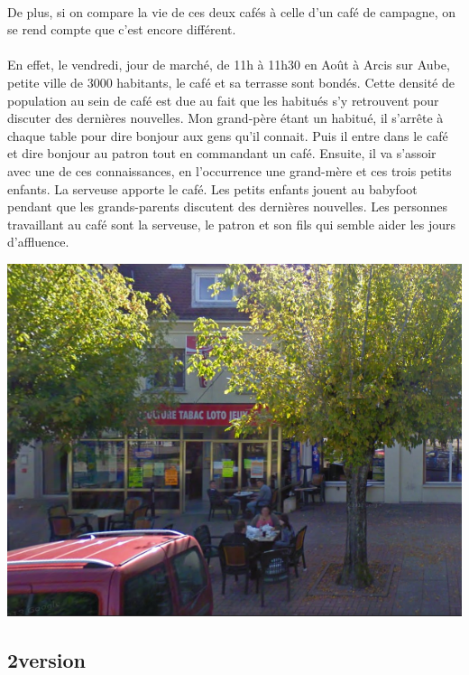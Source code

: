 \paragraph{}
De plus, si on compare la vie de ces deux cafés à celle d’un café de campagne, on se rend compte que c’est encore différent.

\paragraph{}
En effet, le vendredi, jour de marché, de 11h à 11h30 en Août à Arcis sur Aube, petite ville de 3000 habitants, le café et sa terrasse sont bondés. Cette densité de population au sein de café est due au fait que les habitués s’y retrouvent pour discuter des dernières nouvelles. Mon grand-père étant un habitué, il s’arrête à chaque table pour dire bonjour aux gens qu’il connait. Puis il entre dans le café et dire bonjour au patron tout en commandant un café. Ensuite, il va s’assoir avec une de ces connaissances, en l’occurrence une grand-mère et ces trois petits enfants. La serveuse apporte le café. Les petits enfants jouent au babyfoot pendant que les grands-parents discutent des dernières nouvelles. Les personnes travaillant au café sont la serveuse, le patron et son fils qui semble aider les jours d’affluence. 

\begin{center}
\includegraphics[scale=0.5]{BarArcis.PNG}
\end{center}



\subsection{2\ieme version}
